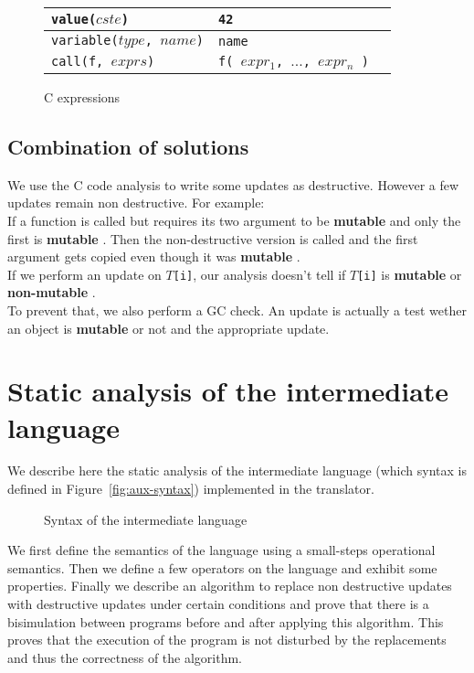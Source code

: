 \documentclass[12pt,a4paper]{article}
\newcommand{\cl}[1]{\texttt{#1}}
\newcommand{\mut}{  \textbf{ mutable } }
\newcommand{\nmut}{ \textbf{ non-mutable } }
\begin{document}
\begin{figure}
\begin{tabular}{|p{50mm}|p{50mm}|p{50mm}|}
\hline
\cl{value($cste$)} & \cl{42} & \\ \hline
\cl{variable($type$, $name$)} & \cl{name} & \\ \hline
\cl{call(f, $exprs$)} & \cl{f( $expr_1$, $...$, $expr_n$ )} & \\ \hline
\end{tabular}
\caption{C expressions}
\end{figure}




\subsection{Combination of solutions}

We use the C code analysis to write some updates as destructive. However a few updates remain non destructive. For example:\\

If a function is called but requires its two argument to be \mut  and only the first is \mut. Then the non-destructive version is called and the first argument gets copied even though it was \mut.\\

If we perform an update on \cl{$T$[i]}, our analysis doesn't tell if \cl{$T$[i]} is \mut or \nmut.\\

To prevent that, we also perform a GC check. An update is actually a test wether an object is \mut or not and the appropriate update.






\newpage
\section{Static analysis of the intermediate language}
\label{staticanal}

We describe here the static analysis of the intermediate language (which syntax is defined in Figure~\ref{fig:aux-syntax}) implemented in the translator.

\begin{figure}[!ht]

\caption{Syntax of the intermediate language}
\end{figure}

We first define the semantics of the language using a small-steps operational semantics. Then we define a few operators on the language and exhibit some properties.
Finally we describe an algorithm to replace non destructive updates with destructive updates under certain conditions and prove that there is a bisimulation between programs before and after applying this algorithm. This proves that the execution of the program is not disturbed by the replacements and thus the correctness of the algorithm.
\end{document}

